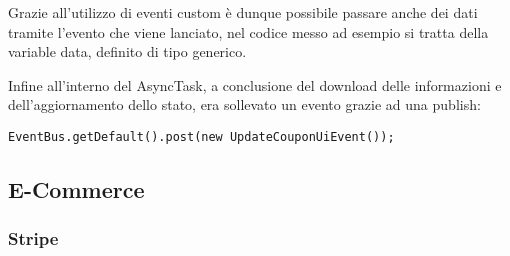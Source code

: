 Grazie all'utilizzo di eventi custom è dunque possibile passare anche dei dati tramite l'evento che viene lanciato, nel codice messo ad esempio si tratta della variable data, definito di tipo generico.

Infine all'interno del AsyncTask, a conclusione del download delle informazioni e dell'aggiornamento dello stato, era sollevato un evento grazie ad una publish:

\begin{lstlisting}
EventBus.getDefault().post(new UpdateCouponUiEvent());
\end{lstlisting}

\subsection{E-Commerce}

\subsubsection{Stripe}

\newpage
